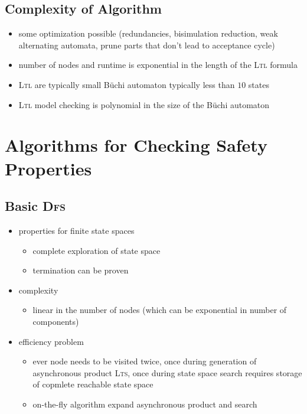 \documentclass[a4paper, 10pt]{article}
\begin{document}
\subsection*{Complexity of Algorithm}
\begin{itemize}
    \item some optimization possible (redundancies, bisimulation reduction, weak alternating automata, prune parts that don't lead to acceptance cycle)
    \item number of nodes and runtime is exponential in the length of the \textsc{Ltl} formula
    \item \textsc{Ltl} are typically small \follows Büchi automaton typically less than $10$ states
    \item \textsc{Ltl} model checking is polynomial in the size of the Büchi automaton
\end{itemize}

\section*{Algorithms for Checking Safety Properties}
\subsection*{Basic \textsc{Dfs}}

\begin{itemize}
    \item properties for finite state spaces
    \begin{itemize}
        \item complete exploration of state space
        \item termination can be proven
    \end{itemize}
    \item complexity
    \begin{itemize}
        \item linear in the number of nodes (which can be exponential in number of components)
    \end{itemize}
    \item efficiency problem
    \begin{itemize}
        \item ever node needs to be visited twice, once during generation of asynchronous product \textsc{Lts}, once during state space search \follows requires storage of copmlete {\tiny reachable} state space
        \item on-the-fly algorithm \follows expand asynchronous product and search
    \end{itemize}
\end{itemize}
\end{document}
